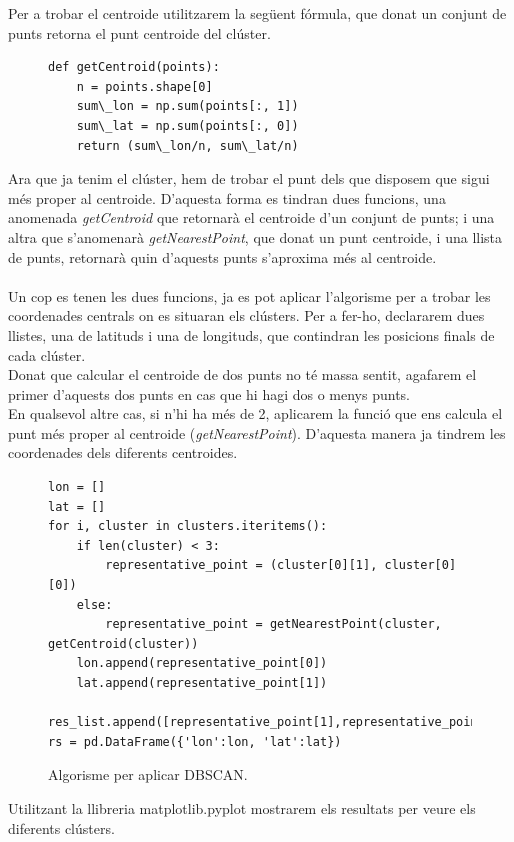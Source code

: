 \documentclass[12pt,a4paper,openright,oneside]{article}
\numberwithin{equation}{section}
\theoremstyle{definition}
\begin{document}
Per a trobar el centroide utilitzarem la següent fórmula, que donat un conjunt de punts retorna el punt centroide del clúster.
\begin{figure}[!htbp]
\begin{verbatim}
def getCentroid(points):
    n = points.shape[0]
    sum\_lon = np.sum(points[:, 1])
    sum\_lat = np.sum(points[:, 0])
    return (sum\_lon/n, sum\_lat/n)
\end{verbatim}
\end{figure}

Ara que ja tenim el clúster, hem de trobar el punt dels que disposem que sigui més proper al centroide. D'aquesta forma es tindran dues funcions, una anomenada \emph{getCentroid} que retornarà el centroide d'un conjunt de punts; i una altra que s'anomenarà \emph{getNearestPoint}, que donat un punt centroide, i una llista de punts, retornarà quin d'aquests punts s'aproxima més al centroide.\\ \\
Un cop es tenen les dues funcions, ja es pot aplicar l'algorisme per a trobar les coordenades centrals on es situaran els clústers. Per a fer-ho, declararem dues llistes, una de latituds i una de longituds, que contindran les posicions finals de cada clúster.\\
Donat que calcular el centroide de dos punts no té massa sentit, agafarem el primer d'aquests dos punts en cas que hi hagi dos o menys punts.\\
En qualsevol altre cas, si n'hi ha més de 2, aplicarem la funció que ens calcula el punt més proper al centroide (\emph{getNearestPoint}). D'aquesta manera ja tindrem les coordenades dels diferents centroides.

\begin{figure}[!htbp]
\begin{verbatim}
lon = []
lat = []
for i, cluster in clusters.iteritems():
    if len(cluster) < 3:
        representative_point = (cluster[0][1], cluster[0][0])
    else:
        representative_point = getNearestPoint(cluster, getCentroid(cluster))
    lon.append(representative_point[0])
    lat.append(representative_point[1])
    res_list.append([representative_point[1],representative_point[0]])
rs = pd.DataFrame({'lon':lon, 'lat':lat})
\end{verbatim}
\caption{Algorisme per aplicar DBSCAN.}
\end{figure}
\newpage
Utilitzant la llibreria matplotlib.pyplot mostrarem els resultats per veure els diferents clústers.
\end{document}
